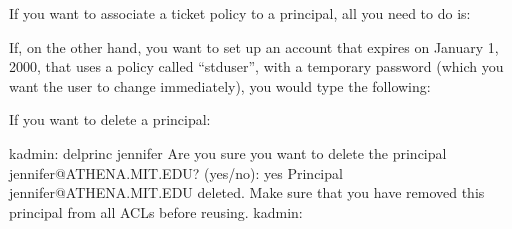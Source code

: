 \documentclass[letterpaper,10pt,english]{sphinxmanual}
\begin{document}
If you want to associate a ticket policy to a principal, all you need
to do is:

%
\begin{sphinxVerbatim}[commandchars=\\\{\}]
    
  
\end{sphinxVerbatim}

If, on the other hand, you want to set up an account that expires on
January 1, 2000, that uses a policy called “stduser”, with a temporary
password (which you want the user to change immediately), you would
type the following:

%
\begin{sphinxVerbatim}[commandchars=\\\{\}]
       
         
   
     
  
\end{sphinxVerbatim}

If you want to delete a principal:

%
\begin{sphinxVerbatim}[commandchars=\\\{\}]
kadmin: delprinc jennifer
Are you sure you want to delete the principal
\PYGZdq{}jennifer@ATHENA.MIT.EDU\PYGZdq{}? (yes/no): yes
Principal \PYGZdq{}jennifer@ATHENA.MIT.EDU\PYGZdq{} deleted.
Make sure that you have removed this principal from
all ACLs before reusing.
kadmin:
\end{sphinxVerbatim}
\end{document}
